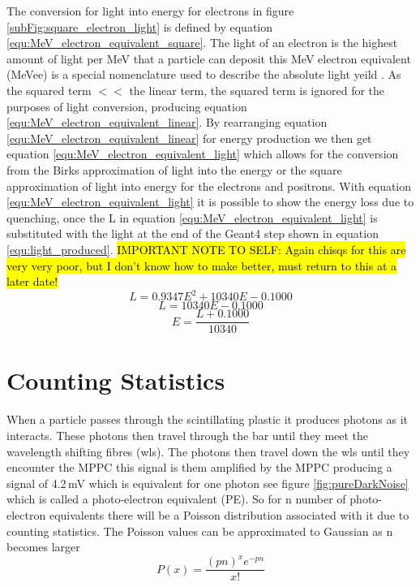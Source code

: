 The conversion for light into energy for electrons in figure \ref{subFig:square_electron_light} is defined by equation \ref{equ:MeV_electron_equivalent_square}. The light of an electron is the highest amount of light per MeV that a particle can deposit this MeV electron equivalent (MeVee) is a special nomenclature used to describe the absolute light yeild \cite{knoll_2010}. As the squared term $ << $ the linear term, the squared term is ignored for the purposes of light conversion, producing equation \ref{equ:MeV_electron_equivalent_linear}. By rearranging equation \ref{equ:MeV_electron_equivalent_linear} for energy production we then get equation \ref{equ:MeV_electron_equivalent_light} which allows for the conversion from the Birks approximation of light into the energy or the square approximation of light into energy for the electrons and positrons. With equation \ref{equ:MeV_electron_equivalent_light} it is possible to show the energy loss due to quenching, once the L in equation \ref{equ:MeV_electron_equivalent_light} is substituted with the light at the end of the Geant4 step shown in equation \ref{equ:light_produced}. \hl{IMPORTANT NOTE TO SELF: Again chisqs for this are very very poor, but I don't know how to make better, must return to this at a later date!} 
\begin{equation}
L = 0.9347E^2 + 10340E - 0.1000
\label{equ:MeV_electron_equivalent_square}
\end{equation}
\begin{equation}
L = 10340E - 0.1000
\label{equ:MeV_electron_equivalent_linear}
\end{equation}
\begin{equation}
E = \frac{L +0.1000}{10340} 
\label{equ:MeV_electron_equivalent_light}
\end{equation}

\section{Counting Statistics} \label{sec:geant4Simulation_countingStats}
When a particle passes through the scintillating plastic it produces photons as it interacts. These photons then travel through the bar until they meet the wavelength shifting fibres (wls). The photons then travel down the wls until they encounter the MPPC  this signal is them amplified by the MPPC producing a signal of 4.2\,mV which is equivalent for one photon see figure \ref{fig:pureDarkNoise} which is called a photo-electron equivalent (PE). So for n number of photo-electron equivalents there will be a Poisson distribution associated with it due to counting statistics. The Poisson values can be approximated to Gaussian as n becomes larger 
\begin{equation}
P(x) = \frac{(pn)^x e^{-pn}}{x!}  
\label{equ:possionProb}
\end{equation}

